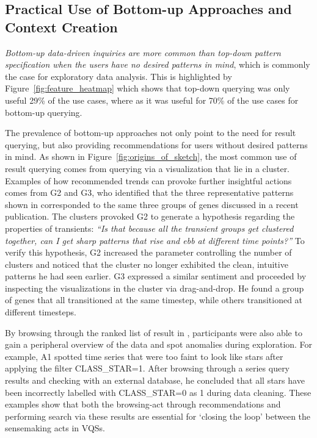 \subsection{Practical Use of Bottom-up Approaches and Context Creation}
\par \emph{Bottom-up data-driven inquiries are more common than top-down pattern specification when the users have no desired patterns in mind}, which is commonly the case for exploratory data analysis. This is highlighted by Figure~\ref{fig:feature_heatmap} which shows that top-down querying was only useful 29\% of the use cases, where as it was useful for 70\% of the use cases for bottom-up querying.
\par The prevalence of bottom-up approaches not only point to the need for result querying, but also providing recommendations for users without desired patterns in mind. As shown in Figure~\ref{fig:origins_of_sketch}, the most common use of result querying comes from querying via a visualization that lie in a cluster. Examples of how recommended trends can provoke further insightful actions comes from G2 and G3, who identified that the three representative patterns shown in \zv {}corresponded to the same three groups of genes discussed in a recent publication\cite{Gloss2017}. The clusters provoked G2 to generate a hypothesis regarding the properties of transients: \textit{``Is that because all the transient groups get clustered together, can I get sharp patterns that rise and ebb at different time points?''} To verify this hypothesis, G2 increased the parameter controlling the number of clusters and noticed that the cluster no longer exhibited the clean, intuitive patterns he had seen earlier. G3 expressed a similar sentiment and proceeded by inspecting the visualizations in the cluster via drag-and-drop. He found a group of genes that all transitioned at the same timestep, while others transitioned at different timesteps.  
\par By browsing through the ranked list of result in \zv, participants were also able to gain a peripheral overview of the data and spot anomalies during exploration. For example, A1 spotted time series that were too faint to look like stars after applying the filter CLASS\_STAR=1. After browsing through a series query results and checking with an external database, he concluded that all stars have been incorrectly labelled with CLASS\_STAR=0 as 1 during data cleaning. These examples show that both the browsing-act through recommendations and performing search via these results are essential for `closing the loop' between the sensemaking acts in VQSs.
